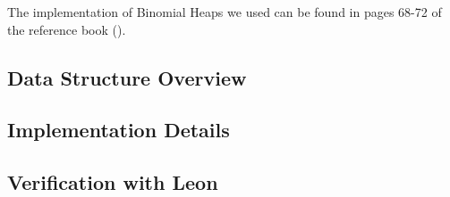 The implementation of Binomial Heaps we used can be found 
in pages 68-72 of the reference book (\cite{Okasaki}).

\subsection{Data Structure Overview}


\subsection{Implementation Details}


\subsection{Verification with Leon}
